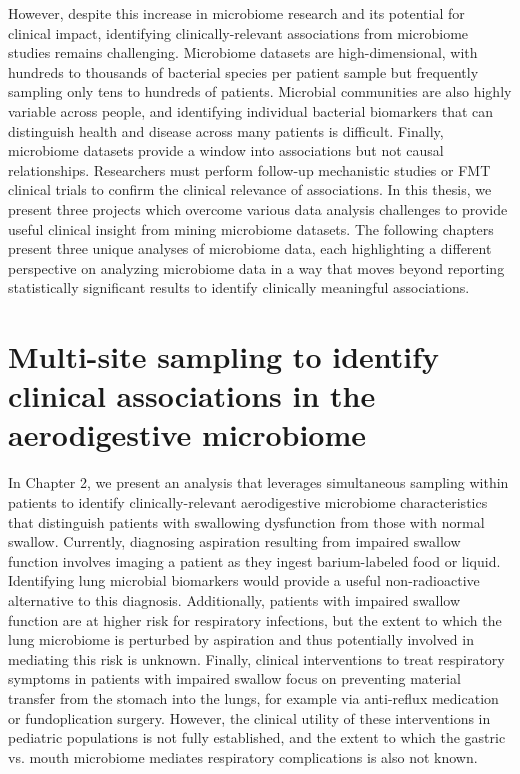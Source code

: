 However, despite this increase in microbiome research and its potential for clinical impact, identifying clinically-relevant associations from microbiome studies remains challenging.
Microbiome datasets are high-dimensional, with hundreds to thousands of bacterial species per patient sample but frequently sampling only tens to hundreds of patients.
Microbial communities are also highly variable across people, and identifying  individual bacterial biomarkers that can distinguish health and disease across many patients is difficult.
Finally, microbiome datasets provide a window into associations but not causal relationships.
Researchers must perform follow-up mechanistic studies or FMT clinical trials to confirm the clinical relevance of associations.
In this thesis, we present three projects which overcome various data analysis challenges to provide useful clinical insight from mining microbiome datasets.
The following chapters present three unique analyses of microbiome data, each highlighting a different perspective on analyzing microbiome data in a way that moves beyond reporting statistically significant results to identify clinically meaningful associations.

\section{Multi-site sampling to identify clinical associations in the aerodigestive microbiome}

In Chapter 2, we present an analysis that leverages simultaneous sampling within patients to identify clinically-relevant aerodigestive microbiome characteristics that distinguish patients with swallowing dysfunction from those with normal swallow.
Currently, diagnosing aspiration resulting from impaired swallow function involves imaging a patient as they ingest barium-labeled food or liquid.
Identifying lung microbial biomarkers would provide a useful non-radioactive alternative to this diagnosis.
Additionally, patients with impaired swallow function are at higher risk for respiratory infections, but the extent to which the lung microbiome is perturbed by aspiration and thus potentially involved in mediating this risk is unknown.
Finally, clinical interventions to treat respiratory symptoms in patients with impaired swallow focus on preventing material transfer from the stomach into the lungs, for example via anti-reflux medication or fundoplication surgery.
However, the clinical utility of these interventions in pediatric populations is not fully established, and the extent to which the gastric vs. mouth microbiome mediates respiratory complications is also not known.

